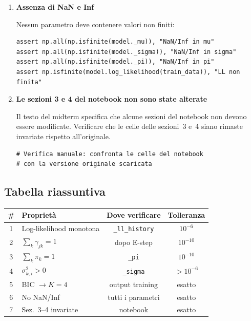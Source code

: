 \documentclass[11pt,a4paper]{article}
\begin{document}
\begin{enumerate}[label=\textbf{\arabic*.}, leftmargin=2em]
\item \textbf{Assenza di NaN e Inf}

Nessun parametro deve contenere valori non finiti:
\begin{lstlisting}[numbers=none]
assert np.all(np.isfinite(model._mu)), "NaN/Inf in mu"
assert np.all(np.isfinite(model._sigma)), "NaN/Inf in sigma"
assert np.all(np.isfinite(model._pi)), "NaN/Inf in pi"
assert np.isfinite(model.log_likelihood(train_data)), "LL non finita"
\end{lstlisting}

\item \textbf{Le sezioni 3 e 4 del notebook non sono state alterate}

Il testo del midterm specifica che alcune sezioni del notebook non devono
essere modificate. Verificare che le celle delle sezioni~3 e~4 siano
rimaste invariate rispetto all'originale.
\begin{lstlisting}[numbers=none]
# Verifica manuale: confronta le celle del notebook
# con la versione originale scaricata
\end{lstlisting}

\end{enumerate}

\subsection{Tabella riassuntiva}

\begin{center}
\renewcommand{\arraystretch}{1.3}
\begin{tabular}{clcc}
\toprule
\textbf{\#} & \textbf{Proprietà} & \textbf{Dove verificare} &
\textbf{Tolleranza} \\
\midrule
1 & Log-likelihood monotona &
\texttt{\_ll\_history} & $10^{-6}$ \\
2 & $\sum_k \gamma_{jk} = 1$ &
dopo E-step & $10^{-10}$ \\
3 & $\sum_k \pi_k = 1$ &
\texttt{\_pi} & $10^{-10}$ \\
4 & $\sigma_{k,i}^2 > 0$ &
\texttt{\_sigma} & $> 10^{-6}$ \\
5 & BIC $\to K=4$ &
output training & esatto \\
6 & No NaN/Inf &
tutti i parametri & esatto \\
7 & Sez.\ 3--4 invariate &
notebook & esatto \\
\bottomrule
\end{tabular}
\end{center}
\end{document}
